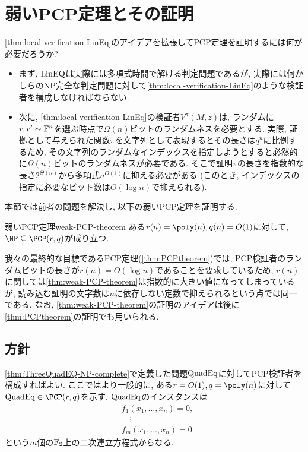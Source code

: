 \section{弱いPCP定理とその証明}
\cref{thm:local-verification-LinEq}のアイデアを拡張してPCP定理を証明するには何が必要だろうか?
\begin{itemize}
  \item まず, $\text{LinEQ}$は実際には多項式時間で解ける判定問題であるが, 実際には何かしらのNP完全な判定問題に対して\cref{thm:local-verification-LinEq}のような検証者を構成しなければならない.  
  \item 次に, \cref{thm:local-verification-LinEq}の検証者$V^\pi(M,z)$は, ランダムに$r,r'\sim\mathbb{F}^n$を選ぶ時点で$\Omega(n)$ビットのランダムネスを必要とする. 実際, 証拠として与えられた関数$\pi$を文字列として表現するとその長さは$q^n$に比例するため, その文字列のランダムなインデックスを指定しようとすると必然的に$\Omega(n)$ビットのランダムネスが必要である. そこで証明$\pi$の長さを指数的な長さ$2^{\Theta(n)}$から多項式$n^{O(1)}$に抑える必要がある (このとき, インデックスの指定に必要なビット数は$O(\log n)$で抑えられる).
\end{itemize}

本節では前者の問題を解決し, 以下の弱いPCP定理を証明する.
\begin{theorem}{弱いPCP定理}{weak-PCP-theorem}
  ある$r(n)=\poly(n),q(n)=O(1)$に対して, $\NP \subseteq \PCP(r,q)$が成り立つ.
\end{theorem}

我々の最終的な目標であるPCP定理(\cref{thm:PCPtheorem})では, PCP検証者のランダムビットの長さが$r(n)=O(\log n)$であることを要求しているため, $r(n)$に関しては\cref{thm:weak-PCP-theorem}は指数的に大きい値になってしまっているが, 読み込む証明の文字数は$n$に依存しない定数で抑えられるという点では同一である.
なお, \cref{thm:weak-PCP-theorem}の証明のアイデアは後に\cref{thm:PCPtheorem}の証明でも用いられる.

\subsection{方針}
  \cref{thm:ThreeQuadEQ-NP-complete}で定義した問題$\text{QuadEq}$に対してPCP検証者を構成すればよい.
  ここではより一般的に, ある$r=O(1),q=\poly(n)$に対して$\QuadEQ\in\PCP(r,q)$を示す.
  $\text{QuadEq}$のインスタンスは
  \begin{align*}
    &f_1(x_1,\dots,x_n) = 0,\\
    &\quad\vdots\\
    &f_m(x_1,\dots,x_n) = 0
  \end{align*}
  という$m$個の$\mathbb{F}_2$上の二次連立方程式からなる.
  
